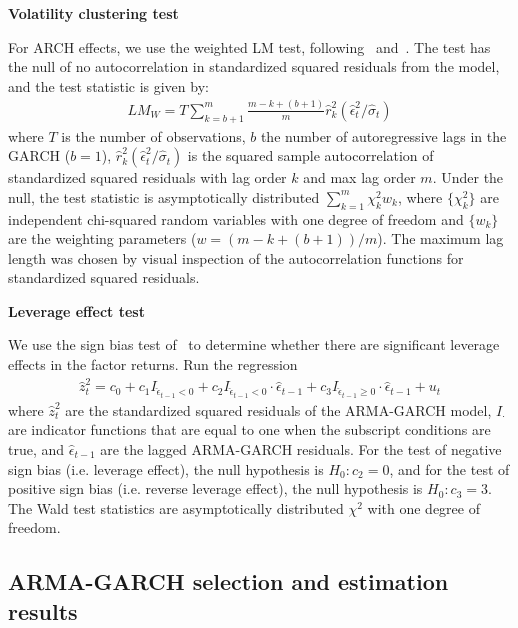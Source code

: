 \textbf{Volatility clustering test}

For ARCH effects, we use the weighted LM test, following~\textcite{FisherGallagher2012} and~\textcite{LiMak1994}. The test has the null of no autocorrelation in standardized squared residuals from the model, and the test statistic is given by:
\begin{align}
	LM_W = T \sum\limits_{k = b + 1}^{m} \frac{m - k + (b+1)}{m} \hat{r}^{2}_{k} (\hat{\epsilon}^{2}_{t} / \hat{\sigma}_{t})
\end{align}
where $T$ is the number of observations, $b$ the number of autoregressive lags in the GARCH ($b=1$), $\hat{r}^2_k (\hat{\epsilon}^2_t / \hat{\sigma}_t)$ is the squared sample autocorrelation of standardized squared residuals with lag order $k$ and max lag order $m$. Under the null, the test statistic is asymptotically distributed $\sum\limits^m_{k = 1} \chi^2_k w_k$, where $\{\chi^2_k\}$ are independent chi-squared random variables with one degree of freedom and $\{w_k\}$ are the weighting parameters ($w = (m - k + (b+1))/m$). The maximum lag length was chosen by visual inspection of the autocorrelation functions for standardized squared residuals.

\textbf{Leverage effect test}

We use the sign bias test of~\textcite{EngleNg1993} to determine whether there are significant leverage effects in the factor returns. Run the regression
\begin{align}
	\hat{z}_t^2 = c_0 + c_1 I_{\hat{\epsilon}_{t-1} < 0} + c_2 I_{\hat{\epsilon}_{t-1} < 0} \cdot \hat{\epsilon}_{t-1} + c_3 I_{\hat{\epsilon}_{t-1} \geq 0} \cdot \hat{\epsilon}_{t-1} + u_t
\end{align}
where $\hat{z}_t^2$ are the standardized squared residuals of the ARMA-GARCH model, $I_\cdot$ are indicator functions that are equal to one when the subscript conditions are true, and $\hat{\epsilon}_{t-1}$ are the lagged ARMA-GARCH residuals. For the test of negative sign bias (i.e. leverage effect), the null hypothesis is $H_0: c_2 = 0$, and for the test of positive sign bias (i.e. reverse leverage effect), the null hypothesis is $H_0: c_3 = 3$. The Wald test statistics are asymptotically distributed $\chi^2$ with one degree of freedom.


\subsection{ARMA-GARCH selection and estimation results}
\label{sub:uni_selection_estimation_results}

